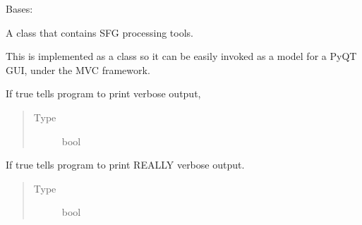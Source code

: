 \documentclass[a4paper,10pt,english]{sphinxmanual}
\begin{document}
\begin{fulllineitems}
\label{\detokenize{sfgtools:sfgtools.SFGProcessTools}}
\sphinxAtStartPar
Bases: 

\sphinxAtStartPar
A class that contains SFG processing tools.

\sphinxAtStartPar
This is implemented as a class so it can be easily invoked as a model for a PyQT GUI, under the MVC
framework.

\begin{fulllineitems}
\label{\detokenize{sfgtools:sfgtools.SFGProcessTools.verbose}}
\sphinxAtStartPar
If true tells program to print verbose output,
\begin{quote}\begin{description}
\item[{Type}] \leavevmode
\sphinxAtStartPar
bool

\end{description}\end{quote}

\end{fulllineitems}


\begin{fulllineitems}
\label{\detokenize{sfgtools:sfgtools.SFGProcessTools.stupid_verbose}}
\sphinxAtStartPar
If true tells program to print REALLY verbose output.
\begin{quote}\begin{description}
\item[{Type}] \leavevmode
\sphinxAtStartPar
bool

\end{description}\end{quote}

\end{fulllineitems}



\end{fulllineitems}
\end{document}
